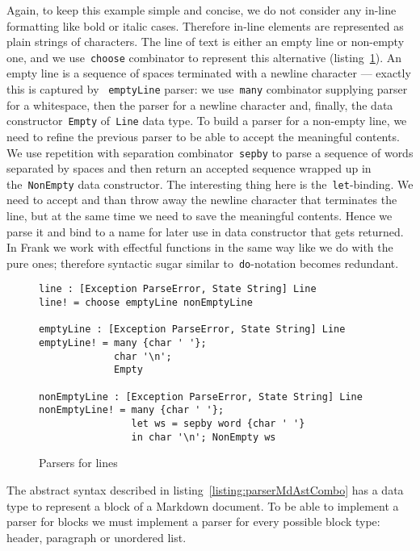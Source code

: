       Again, to keep this example simple and concise, we do not consider any in-line
      formatting like bold or italic cases. Therefore in-line elements are represented
      as plain strings of characters. The line of text is either an empty line or
      non-empty one, and we use~\texttt{choose} combinator to represent this
      alternative (listing~\ref{listing:parserLineCombo}). An empty line is a sequence of
      spaces terminated with a newline character --- exactly this is captured by
      ~\texttt{emptyLine} parser: we use~\texttt{many} combinator supplying parser
      for a whitespace, then the parser for a newline character and, finally, the
      data constructor~\texttt{Empty} of~\texttt{Line} data type. To build a parser for
      a non-empty line, we need to refine the previous parser to be able to accept the
      meaningful contents. We use repetition with separation combinator~\texttt{sepby}
      to parse a sequence of words separated by spaces and then return an accepted sequence
      wrapped up in the~\texttt{NonEmpty} data constructor. The interesting
      thing here is the~\texttt{let}-binding. We need to accept and than throw away
      the newline character that terminates the line, but at the same time we need to save
      the meaningful contents. Hence we parse it and bind to a name for later use in
      data constructor that gets returned. In Frank we work with
      effectful functions in the same way like we do with the pure ones; therefore
      syntactic sugar similar to~\texttt{do}-notation becomes redundant.

      \begin{figure}[h]
      \begin{lstlisting}
line : [Exception ParseError, State String] Line
line! = choose emptyLine nonEmptyLine

emptyLine : [Exception ParseError, State String] Line
emptyLine! = many {char ' '};
             char '\n';
             Empty

nonEmptyLine : [Exception ParseError, State String] Line
nonEmptyLine! = many {char ' '};
                let ws = sepby word {char ' '}
                in char '\n'; NonEmpty ws
      \end{lstlisting}
      \caption{Parsers for lines}
      \label{listing:parserLineCombo}
      \end{figure}

      The abstract syntax described in listing~\ref{listing:parserMdAstCombo}
      has a data type to represent a block of a Markdown document. To be able to
      implement a parser for blocks we must implement a parser for every possible
      block type: header, paragraph or unordered list.

